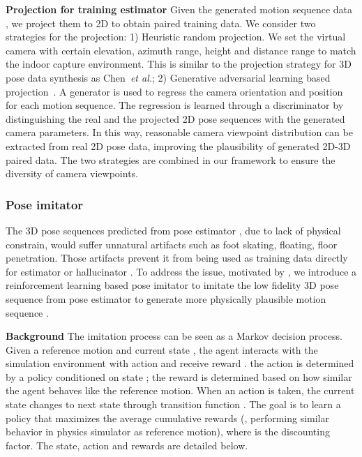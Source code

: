 \documentclass[10pt,twocolumn,letterpaper]{article}
\newcommand{\et}{\emph{et al.}}
\begin{document}
\noindent \textbf{Projection for training estimator}
Given the generated motion sequence data , we project them to 2D to obtain paired training data.
We consider two strategies for the projection: 
1) Heuristic random projection.
We set the virtual camera with certain elevation, azimuth range, height and distance range to match the {indoor capture environment}. This is similar to the projection strategy for 3D pose data synthesis as Chen~\et\cite{chen2016synthesizing};
2) Generative adversarial learning based projection~\cite{gong2021poseaug}. A generator is used to regress the camera orientation and position for each motion sequence. The regression is learned through a discriminator by distinguishing the real and the projected 2D pose sequences with the generated camera parameters.
In this way, reasonable camera viewpoint distribution can be extracted from real 2D pose data, improving the plausibility of generated 2D-3D paired data.
The two strategies are combined in our framework to ensure the diversity of camera viewpoints.

\subsubsection{Pose imitator}
The 3D pose sequences  predicted from pose estimator  , due to lack of physical constrain, would suffer unnatural artifacts such as foot skating, floating, floor penetration. 
Those artifacts prevent it from being used as training data directly for estimator  or hallucinator .
To address the issue, motivated by \cite{peng2018deepmimic,peng2018sfv, yuan2021simpoe}, we introduce a reinforcement learning based pose imitator   to imitate the low fidelity 3D pose sequence  from pose estimator to generate  more physically plausible motion sequence .

\noindent \textbf{Background}
The imitation process can be seen as a Markov decision process.
Given a reference motion and current state , the agent interacts with the simulation environment with action  and receive reward .
the action is determined by a policy  conditioned on state ;
the reward is determined based on how similar the agent behaves like the reference motion.
When an action is taken, the current state  changes to next state  through transition function .
The goal is to learn a policy that maximizes the average cumulative rewards  (\ie, performing similar behavior in physics simulator as reference motion), where  is the discounting factor. The state, action and rewards are detailed below.
\end{document}
